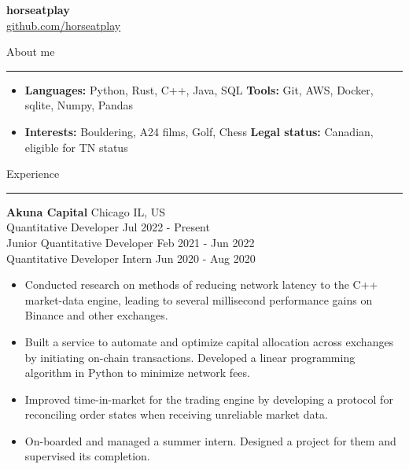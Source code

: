 \documentclass[12pt]{article}
\newcommand{\rSection}[1]{
    \medskip
    {\Large #1}
    \medskip
    \hrule
}
\begin{document}
\begin{center} 
    {\bf \Huge horseatplay} \\
    \vspace{5pt}
    \href{https://www.github.com/horseatplay}{github.com/horseatplay}
\end{center}
\vspace{-15pt}


\rSection{About me}
\begin{itemize}[label={},leftmargin=0pt]
    \item{
        \textbf{Languages:} Python, Rust, C++, Java, SQL
        \hfill
        \textbf{Tools:} Git, AWS, Docker, sqlite, Numpy, Pandas
        \vspace{-5pt}
    }
    \item{
        \textbf{Interests:} Bouldering, A24 films, Golf, Chess
        \hfill
        \textbf{Legal status:} Canadian, eligible for TN status
        \vspace{-5pt}
    }
\end{itemize}


\rSection{Experience}

{\bf Akuna Capital} \hfill Chicago IL, US\\
Quantitative Developer \hfill Jul 2022 - Present\\
Junior Quantitative Developer \hfill Feb 2021 - Jun 2022\\
Quantitative Developer Intern \hfill Jun 2020 - Aug 2020\\
\vspace{-18pt}
\begin{itemize}[leftmargin=13pt]
    \item Conducted research on methods of reducing network latency to the C++ market-data engine, leading to several millisecond performance gains on Binance and other exchanges.
    \vspace{-5pt}
    \item Built a service to automate and optimize capital allocation across exchanges by initiating on-chain transactions. Developed a linear programming algorithm in Python to minimize network fees.
    \vspace{-5pt}
    \item Improved time-in-market for the trading engine by developing a protocol for reconciling order states when receiving unreliable market data.
    \vspace{-5pt}
    \item On-boarded and managed a summer intern. Designed a project for them and supervised its completion.
\end{itemize}
\end{document}
